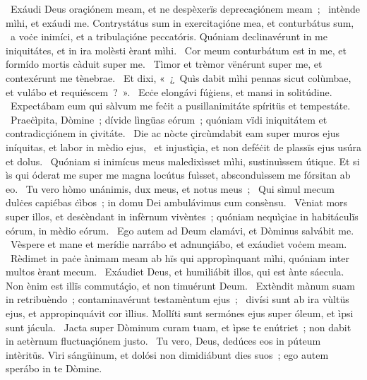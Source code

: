 ~Exáudi Deus oraçiónem meam, et ne despèxerïs deprecaçiónem meam~; 
~intènde mìhi, et exáudi me. Contrystátus sum in exercitaçióne mea, et conturbátus sum, 
~a voċe inimíci, et a tribulaçióne peccatóris. Quóniam declinavérunt in me iniquitátes, et in ira molèsti èrant mìhi. 
~Cor meum conturbátum est in me, et formído mortis càduit super me. 
~Tìmor et trèmor vënérunt super me, et contexérunt me tènebrae. 
~Et dixi, «~¿~Quìs dabit mìhi pennas sicut colùmbae, et vulábo et requiéscem~?~». 
~Ecċe elongávi fúġiens, et mansi in solitúdine. 
~Expectábam eum qui sàlvum me feċit a pusillanimitáte spíritüs et tempestáte. 
~Praeċìpita, Dòmine~; dívide lìngüas eórum~; quóniam vïdi iniquitátem et contradicçiónem in çivitáte. 
~Die ac nòcte çircùmdabit eam super muros ejus iníquitas, et labor in mèdio ejus, 
~et injustìçia, et non deféċit de plassïs ejus usúra et dolus. 
~Quóniam si inimícus meus maledixìsset mìhi, sustinuìssem útique. Et si ìs qui óderat me super me magna locútus fuìsset, absconduìssem me fórsitan ab eo. 
~Tu vero hòmo unánimis, dux meus, et notus meus~; 
~Qui sìmul mecum dulċes capiébas ċìbos~; in domu Dei ambulávimus cum consènsu. 
~Vèniat mors super illos, et desċèndant in infèrnum vivèntes~; quóniam nequìçiae in habitáculïs eórum, in mèdio eórum. 
~Ego autem ad Deum clamávi, et Dòminus salvábit me. 
~Vèspere et mane et merídie narrábo et adnunçiábo, et exáudiet voċem meam. 
~Rèdimet in paċe ànimam meam ab hïs qui appropìnquant mìhi, quóniam inter multos èrant mecum. 
~Exáudiet Deus, et humiliábit illos, qui est ànte sáecula. Non ènim est illïs commutáçio, et non timuérunt Deum. 
~Extèndit mànum suam in retribuèndo~; contaminavérunt testamèntum ejus~; 
~divísi sunt ab ira vùltüs ejus, et appropinquávit cor ìllius. Mollíti sunt sermónes ejus super óleum, et ìpsi sunt jácula. 
~Jacta super Dòminum curam tuam, et ìpse te enútriet~; non dabit in aetèrnum fluctuaçiónem justo. 
~Tu vero, Deus, dedúces eos in púteum intèritüs. Vìri sángüinum, et dolósi non dimidiábunt dies suos~; ego autem sperábo in te Dòmine. 
